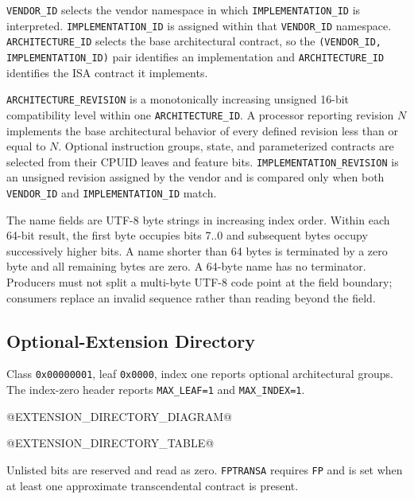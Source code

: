 \texttt{VENDOR\_ID} selects the vendor namespace in which \texttt{IMPLEMENTATION\_ID} is interpreted.
\texttt{IMPLEMENTATION\_ID} is assigned within that \texttt{VENDOR\_ID} namespace.
\texttt{ARCHITECTURE\_ID} selects the base architectural contract, so the
\texttt{(VENDOR\_ID, IMPLEMENTATION\_ID)} pair identifies an implementation and
\texttt{ARCHITECTURE\_ID} identifies the ISA contract it implements.

\texttt{ARCHITECTURE\_REVISION} is a monotonically increasing unsigned 16-bit compatibility level within one
\texttt{ARCHITECTURE\_ID}. A processor reporting revision \(N\) implements the base architectural behavior of every
defined revision less than or equal to \(N\). Optional instruction groups, state, and parameterized contracts are
selected from their CPUID leaves and feature bits. \texttt{IMPLEMENTATION\_REVISION} is an unsigned revision assigned
by the vendor and is compared only when both \texttt{VENDOR\_ID} and \texttt{IMPLEMENTATION\_ID} match.

The name fields are UTF-8 byte strings in increasing index order. Within each 64-bit result, the first byte occupies
bits 7..0 and subsequent bytes occupy successively higher bits. A name shorter than 64 bytes is terminated by a zero
byte and all remaining bytes are zero. A 64-byte name has no terminator. Producers must not split a multi-byte UTF-8
code point at the field boundary; consumers replace an invalid sequence rather than reading beyond the field.

\subsection{Optional-Extension Directory}\label{section:cpuid-extension-directory}
Class \texttt{0x00000001}, leaf \texttt{0x0000}, index one reports optional architectural groups. The index-zero
header reports \texttt{MAX\_LEAF=1} and \texttt{MAX\_INDEX=1}.

@EXTENSION_DIRECTORY_DIAGRAM@

@EXTENSION_DIRECTORY_TABLE@

Unlisted bits are reserved and read as zero. \texttt{FPTRANSA} requires \texttt{FP} and is set when at least one approximate
transcendental contract is present.


